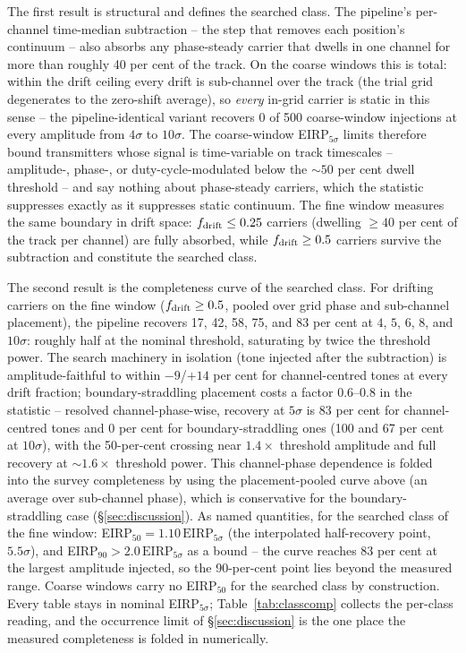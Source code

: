 \documentclass{openjournal}
\begin{document}
The first result is structural and defines the searched class. The
pipeline's per-channel time-median subtraction -- the step that
removes each position's continuum -- also absorbs any phase-steady
carrier that dwells in one channel for more than roughly 40 per cent
of the track. On the coarse windows this is total: within the
drift ceiling every drift is sub-channel over the track (the trial
grid degenerates to the zero-shift average), so \emph{every} in-grid
carrier is static in this sense -- the pipeline-identical variant
recovers 0 of 500 coarse-window injections at every amplitude from
$4\sigma$ to $10\sigma$. The coarse-window EIRP$_{5\sigma}$ limits
therefore bound transmitters whose signal is time-variable on track
timescales -- amplitude-, phase-, or duty-cycle-modulated below the
${\sim}50$ per cent dwell threshold -- and say nothing about
phase-steady carriers, which the statistic suppresses exactly as it
suppresses static continuum. The fine window measures the same
boundary in drift space: $f_{\rm drift}\leq0.25$ carriers (dwelling
${\geq}40$ per cent of the track per channel) are fully absorbed,
while $f_{\rm drift}\geq0.5$ carriers survive the subtraction and
constitute the searched class.

The second result is the completeness curve of the searched class.
For drifting carriers on the fine window ($f_{\rm drift}\geq0.5$,
pooled over grid phase and sub-channel placement), the pipeline
recovers 17, 42, 58, 75, and 83 per cent at $4$, $5$, $6$, $8$, and
$10\sigma$: roughly half at the nominal threshold, saturating by
twice the threshold power. The search machinery in isolation (tone
injected after the subtraction) is amplitude-faithful to within
$-9$/$+14$ per cent for channel-centred tones at every drift
fraction; boundary-straddling placement costs a factor $0.6$--$0.8$
in the statistic -- resolved channel-phase-wise, recovery at $5\sigma$
is 83 per cent for channel-centred tones and 0 per cent for
boundary-straddling ones (100 and 67 per cent at $10\sigma$), with
the 50-per-cent crossing near $1.4\times$ threshold amplitude and
full recovery at ${\sim}1.6\times$ threshold power. This
channel-phase dependence is folded into the survey completeness by
using the placement-pooled curve above (an average over sub-channel
phase), which is conservative for the boundary-straddling case
(\S\ref{sec:discussion}). As named quantities, for the searched class
of the fine window: EIRP$_{50} = 1.10\,\mathrm{EIRP}_{5\sigma}$ (the
interpolated half-recovery point, $5.5\sigma$), and
EIRP$_{90} > 2.0\,\mathrm{EIRP}_{5\sigma}$ as a bound -- the curve
reaches 83 per cent at the largest amplitude injected, so the
90-per-cent point lies beyond the measured range. Coarse windows
carry no EIRP$_{50}$ for the searched class by construction. Every
table stays in nominal EIRP$_{5\sigma}$; Table~\ref{tab:classcomp}
collects the per-class reading, and the occurrence limit of
\S\ref{sec:discussion} is the one place the measured completeness is
folded in numerically.
\end{document}
